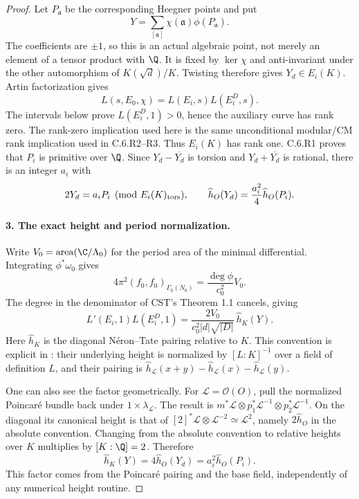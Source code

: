 \begin{proof}
Let $P_{\mathfrak a}$ be the corresponding Heegner points and put
\[
 Y=\sum_{[\mathfrak a]}\chi(\mathfrak a)\phi(P_{\mathfrak a}).
\]
The coefficients are $\pm1$, so this is an actual algebraic point,
not merely an element of a tensor product with $\Q$. It is fixed
by $\ker\chi$ and anti-invariant under the other automorphism of
$K(\sqrt d)/K$. Twisting therefore gives $Y_d\in E_i(K)$.
Artin factorization gives
\[
 L(s,E_0,\chi)=L(E_i,s)L(E_i^D,s).
\]
The intervals below prove $L(E_i^D,1)>0$, hence the auxiliary
curve has rank zero. The rank-zero implication used here is the
same unconditional modular/CM rank implication used in C.6.R2--R3.
Thus $E_i(K)$ has rank one. C.6.R1 proves that $P_i$ is primitive
over $\Q$. Since $Y_d-\overline{Y_d}$ is torsion and
$Y_d+\overline{Y_d}$ is rational, there is an integer $a_i$ with
\[
 2Y_d=a_iP_i\pmod{E_i(K)_{\rm tors}},\qquad
 \widehat h_O(Y_d)=\frac{a_i^2}{4}\widehat h_O(P_i).
\]

\paragraph{3. The exact height and period normalization.}
Write $V_0=\operatorname{area}(\C/\Lambda_0)$ for the period area
of the minimal differential. Integrating $\phi^*\omega_0$ gives
\[
 4\pi^2(f_0,f_0)_{\Gamma_0(N_0)}
   =\frac{\deg\phi}{c_0^2}V_0.
\]
The degree in the denominator of CST's Theorem 1.1 cancels, giving
\begin{equation}\label{ari:eq:Cgz-product}
 L'(E_i,1)L(E_i^D,1)
  =\frac{2V_0}{c_0^2|d|\sqrt{|D|}}\,\widehat h_K(Y).
\end{equation}
Here $\widehat h_K$ is the diagonal N\'eron--Tate pairing relative
to $K$. This convention is explicit in
\citet[\S7.1.1, pp.~218--219, Theorem 7.1.2]{CgzYZZ2011}:
their underlying height is normalized by $[L:K]^{-1}$ over a
field of definition $L$, and their pairing is
$\widehat h_{\mathcal L}(x+y)-\widehat h_{\mathcal L}(x)
-\widehat h_{\mathcal L}(y)$.

One can also see the factor geometrically. For
$\mathcal L=\mathcal O(O)$, pull the normalized Poincar\'e bundle
back under $1\times\lambda_{\mathcal L}$. The result is
$m^*\mathcal L\otimes p_1^*\mathcal L^{-1}\otimes
p_2^*\mathcal L^{-1}$. On the diagonal its canonical height is
that of $[2]^*\mathcal L\otimes\mathcal L^{-2}\simeq
\mathcal L^2$, namely $2\widehat h_O$ in the absolute convention.
Changing from the absolute convention to relative heights over
$K$ multiplies by $[K:\Q]=2$. Therefore
\[
 \widehat h_K(Y)=4\widehat h_O(Y_d)
                =a_i^2\widehat h_O(P_i).
\]
This factor comes from the Poincar\'e pairing and the base field,
independently of any numerical height routine.


\end{proof}
